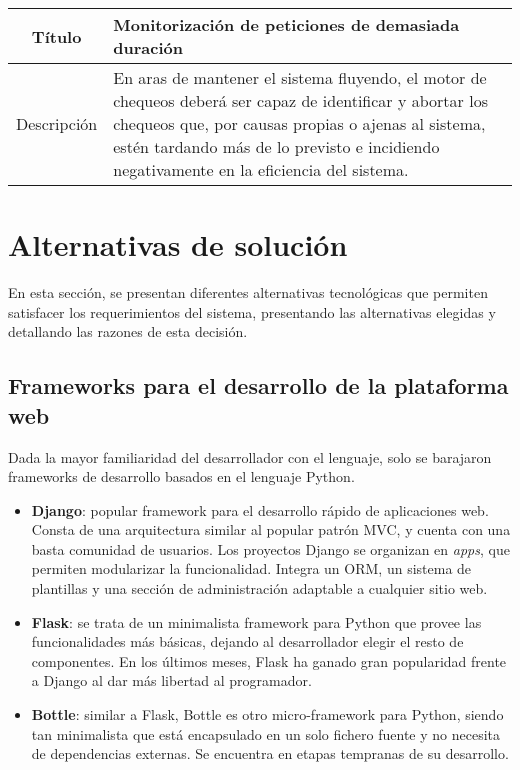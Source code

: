 \begin{center}
  
  \begin{tabularx}{\textwidth}{|c|X|}
    \hline
    Título & Monitorización de peticiones de demasiada duración \\

    \hline

    Descripción & En aras de mantener el sistema fluyendo, el motor de chequeos
    deberá ser capaz de identificar y abortar los chequeos que, por causas
    propias o ajenas al sistema, estén tardando más de lo previsto e incidiendo
    negativamente en la eficiencia del sistema. \\

    \hline
  \end{tabularx}
\end{center}

\section{Alternativas de solución}
\label{sec:alternativas-solucion}

En esta sección, se presentan diferentes alternativas tecnológicas que permiten
satisfacer los requerimientos del sistema, presentando las alternativas elegidas
y detallando las razones de esta decisión.


\subsection{Frameworks para el desarrollo de la plataforma web}

Dada la mayor familiaridad del desarrollador con el lenguaje, solo se barajaron
frameworks de desarrollo basados en el lenguaje Python.

\begin{itemize}
\item \textbf{Django}: popular framework para el desarrollo rápido de
  aplicaciones web. Consta de una arquitectura similar al popular patrón
  \ac{MVC}, y cuenta con una basta comunidad de usuarios. Los proyectos Django
  se organizan en \textit{apps}, que permiten modularizar la
  funcionalidad. Integra un \ac{ORM}, un sistema de plantillas y una sección de
  administración adaptable a cualquier sitio web.

\item \textbf{Flask}: se trata de un minimalista framework para Python que
  provee las funcionalidades más básicas, dejando al desarrollador elegir el
  resto de componentes. En los últimos meses, Flask ha ganado gran popularidad
  frente a Django al dar más libertad al programador.

\item \textbf{Bottle}: similar a Flask, Bottle es otro micro-framework para
  Python, siendo tan minimalista que está encapsulado en un solo fichero fuente
  y no necesita de dependencias externas. Se encuentra en etapas tempranas de su desarrollo.

\end{itemize}


